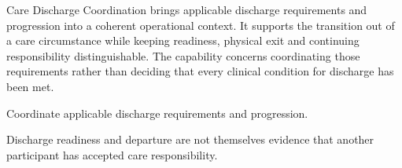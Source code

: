 Care Discharge Coordination brings applicable discharge requirements and progression into a coherent operational context. It supports the transition out of a care circumstance while keeping readiness, physical exit and continuing responsibility distinguishable. The capability concerns coordinating those requirements rather than deciding that every clinical condition for discharge has been met.



Coordinate applicable discharge requirements and progression.



Discharge readiness and departure are not themselves evidence that another participant has accepted care responsibility.


